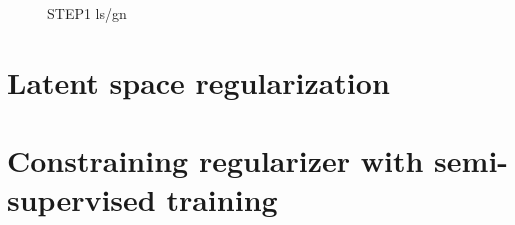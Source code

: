 \begin{figure}
    \caption{ STEP1 ls/gn }
    \label{fig:step_1}
\end{figure}


\section{Latent space regularization}

\section{Constraining regularizer with semi-supervised training}

